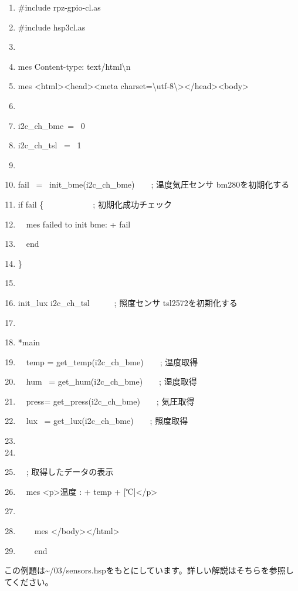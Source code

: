 \centering
\begin{boxedminipage}{16.81cm}
	\begin{enumerate}
	\baselineskip 10pt
	\setlength{\itemsep}{0cm}
	\item\#include {\textquotedbl}rpz-gpio-cl.as{\textquotedbl}
	\item\#include {\textquotedbl}hsp3cl.as{\textquotedbl}
	\item
	\item mes {\textquotedbl}Content-type: text/html{\textbackslash}n{\textquotedbl}
	\item mes {\textquotedbl}{\textless}html{\textgreater}{\textless}head{\textgreater}{\textless}meta
	 charset={\textbackslash}{\textquotedbl}utf-8{\textbackslash}{\textquotedbl}{\textgreater}{\textless}/head{\textgreater}{\textless}body{\textgreater}{\textquotedbl}
	\item
	\item i2c\_ch\_bme\ = \ 0
	\item i2c\_ch\_tsl \ = \ 1
	\item
	\item fail \ = \ init\_bme(i2c\_ch\_bme)\ \ \ \ ; 温度気圧センサ bm280を初期化する
	\item if fail \{\ \ \ \ \ \ \ \ \ \ \ \   ; 初期化成功チェック
	\item\ \ mes {\textquotedbl}failed to init bme: {\textquotedbl} + fail
	\item\ \ end
	\item\}
	\item
	\item init\_lux i2c\_ch\_tsl\ \ \ \ \ \ ; 照度センサ tsl2572を初期化する
	\item
	\item*main
	\item\ \ temp = get\_temp(i2c\_ch\_bme)\ \ \ \ ; 温度取得
	\item\ \ hum \ = get\_hum(i2c\_ch\_bme)\ \ \ \ ; 湿度取得
	\item\ \ press= get\_press(i2c\_ch\_bme)\ \ \ \ ; 気圧取得
	\item\ \ lux \ = get\_lux(i2c\_ch\_bme)\ \ \ \ ; 照度取得
	\item
	\item
	\item\ \ ; 取得したデータの表示
	\item\ \ mes {\textquotedbl}{\textless}p{\textgreater}温度 : {\textquotedbl} + temp + {\textquotedbl}
	[℃]{\textless}/p{\textgreater}{\textquotedbl}
	\item
	\item\ \ \ \ mes {\textquotedbl}{\textless}/body{\textgreater}{\textless}/html{\textgreater}{\textquotedbl}
	\item\ \ \ \ end
	\end{enumerate}
\end{boxedminipage}
\flushleft
この例題は{\textasciitilde}/03/sensors.hspをもとにしています。詳しい解説はそちらを参照してください。

